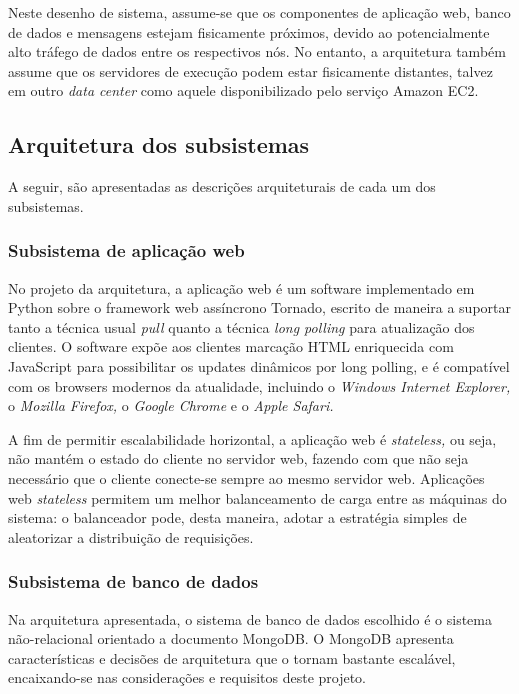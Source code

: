 \documentclass[ruledheader, 12pt]{abnt}
\begin{document}
Neste desenho de sistema, assume-se que os componentes de aplicação web, banco de dados e mensagens estejam fisicamente próximos, devido ao potencialmente alto tráfego de dados entre os respectivos nós. No entanto, a arquitetura também assume que os servidores de execução podem estar fisicamente distantes, talvez em outro \emph{data center} como aquele disponibilizado pelo serviço Amazon EC2.

\subsection{Arquitetura dos subsistemas}

A seguir, são apresentadas as descrições arquiteturais de cada um dos subsistemas.

\subsubsection{Subsistema de aplicação web}

No projeto da arquitetura, a aplicação web é um software implementado em Python sobre o framework web assíncrono Tornado, escrito de maneira a suportar tanto a técnica usual \emph{pull} quanto a técnica \emph{long polling} para atualização dos clientes. O software expõe aos clientes marcação HTML enriquecida com JavaScript para possibilitar os updates dinâmicos por long polling, e é compatível com os browsers modernos da atualidade, incluindo o \emph{Windows Internet Explorer,} o \emph{Mozilla Firefox,} o \emph{Google Chrome} e o \emph{Apple Safari.}

A fim de permitir escalabilidade horizontal, a aplicação web é \emph{stateless,} ou seja, não mantém o estado do cliente no servidor web, fazendo com que não seja necessário que o cliente conecte-se sempre ao mesmo servidor web. Aplicações web \emph{stateless} permitem um melhor balanceamento de carga entre as máquinas do sistema: o balanceador pode, desta maneira, adotar a estratégia simples de aleatorizar a distribuição de requisições.

\subsubsection{Subsistema de banco de dados}

Na arquitetura apresentada, o sistema de banco de dados escolhido é o sistema não-relacional orientado a documento MongoDB. O MongoDB apresenta características e decisões de arquitetura que o tornam bastante escalável, encaixando-se nas considerações e requisitos deste projeto.
\end{document}
